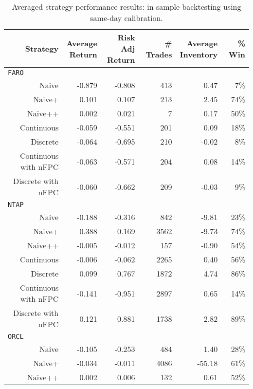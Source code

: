 \begin{table}
\centering
{}
\caption[In-sample backtesting performance using same-day calibration]{Averaged strategy performance results: in-sample backtesting using same-day calibration.}\label{tbl:IS_sameday}
\setlength{\tabcolsep}{9pt}
\begin{tabular}{@{} *{6}{r} @{}}
\toprule
Strategy & \cellbreak{t}{r}{Average \\ Return} & \cellbreak{t}{r}{Risk Adj \\ Return} & \cellbreak{t}{r}{\# Trades \\ \hphantom{Risk Adj}} & \cellbreak{t}{r}{Average \\ Inventory} & \cellbreak{t}{r}{\% Win \\ \hphantom{Risk Adj}} \\
\midrule
\multicolumn{6}{l}{\texttt{FARO}} \\
Naive & -0.879 & -0.808 & 413 & 0.47 & 7\%  \\ 
Naive+ & 0.101 & 0.107 & 213 & 2.45 & 74\%  \\ 
Naive++ & 0.002 & 0.021 & 7 & 0.17 & 50\%  \\ 
Continuous & -0.059 & -0.551 & 201 & 0.09 & 18\%  \\ 
Discrete & -0.064 & -0.695 & 210 & -0.02 & 8\%  \\ 
Continuous with nFPC & -0.063 & -0.571 & 204 & 0.08 & 14\%  \\ 
Discrete with nFPC & -0.060 & -0.662 & 209 & -0.03 & 9\%  \\[2ex]
\multicolumn{6}{l}{\texttt{NTAP}} \\
Naive & -0.188 & -0.316 & 842 & -9.81 & 23\% \\ 
Naive+ & 0.388 & 0.169 & 3562 & -9.73 & 74\% \\ 
Naive++ & -0.005 & -0.012 & 157 & -0.90 & 54\%  \\ 
Continuous & -0.006 & -0.062 & 2265 & 0.40 & 56\%  \\ 
Discrete & 0.099 & 0.767 & 1872 & 4.74 & 86\%  \\ 
Continuous with nFPC & -0.141 & -0.951 & 2897 & 0.65 & 14\% \\ 
Discrete with nFPC & 0.121 & 0.881 & 1738 & 2.82 & 89\%  \\[2ex]
\multicolumn{6}{l}{\texttt{ORCL}} \\
Naive & -0.105 & -0.253 & 484 & 1.40 & 28\%  \\ 
Naive+ & -0.034 & -0.011 & 4086 & -55.18 & 61\% \\ 
Naive++ & 0.002 & 0.006 & 132 & 0.61 & 52\% \\ 

\end{tabular}
\end{table}
